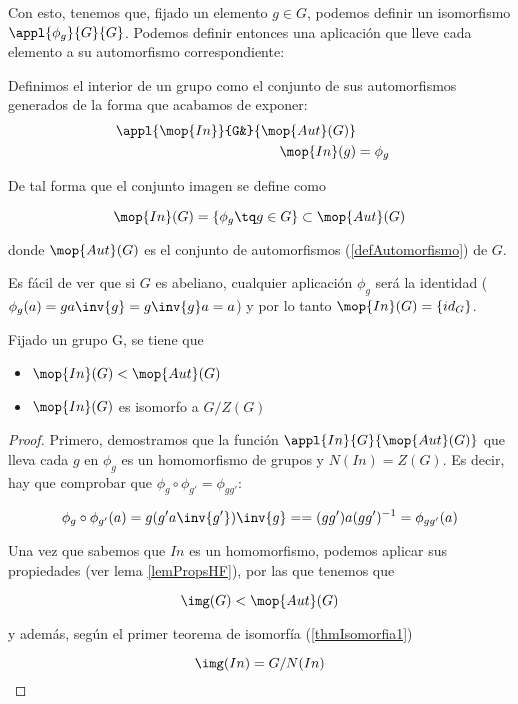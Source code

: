 \documentclass[nochap]{apuntes}
\begin{document}
Con esto, tenemos que, fijado un elemento $g\in G$, podemos definir un isomorfismo $\appl{\phi _g}{G}{G}$. Podemos definir entonces una aplicación que lleve cada elemento a su automorfismo correspondiente:

\begin{defn} Definimos el interior de un grupo como el conjunto de sus automorfismos generados de la forma que acabamos de exponer:
\begin{align*}
 \appl{\mop{In}}{G&}{\mop{Aut}(G)} \\
 \mop{In}(g) &= \phi_g
\end{align*}

 De tal forma que el conjunto imagen se define como

\[ \mop{In}(G) = \{ \phi_g \tq g\in G\} \subset \mop{Aut}(G) \]

donde $\mop{Aut}(G)$ es el conjunto de automorfismos (\ref{defAutomorfismo}) de $G$.
\end{defn}

Es fácil de ver que si $G$ es abeliano, cualquier aplicación $\phi_g$ será la identidad ($\phi_g(a) = g a \inv{g} = g\inv{g}a = a$) y por lo tanto $\mop{In}(G) = \{ id_G \}$.

\begin{theorem}
Fijado un grupo G, se tiene que
\begin{itemize}
\item $\mop{In}(G) < \mop{Aut}(G)$
\item $\mop{In}(G)$ es isomorfo a $G/Z(G)$
\end{itemize}
\end{theorem}

\begin{proof}
Primero, demostramos que la función $\appl{In}{G}{\mop{Aut}(G)}$ que lleva cada $g$ en $\phi _g$ es un homomorfismo de grupos y $N(In) = Z(G)$. Es decir, hay que comprobar que $\phi_g\circ \phi_{g'} = \phi_{gg'}$:

\[ \phi _g \circ \phi _{g'} (a) = g(g'a\inv{g'})\inv{g} == (gg')a(gg')^{-1} = \phi_{gg'} (a) \]

 Una vez que sabemos que $In$ es un homomorfismo, podemos aplicar sus propiedades (ver lema \ref{lemPropsHF}), por las que tenemos que

 \[ \img(G) < \mop{Aut}(G) \]

y además, según el primer teorema de isomorfía (\ref{thmIsomorfia1})

\[ \img(In) = G/N(In) \]
\end{proof}
\end{document}
